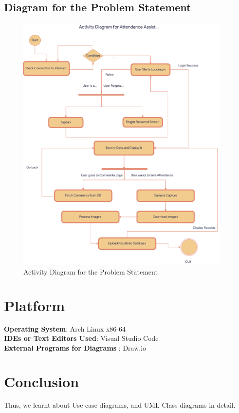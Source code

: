 \documentclass[11pt]{article}
\begin{document}
\clearpage
\subsection{Diagram for the Problem Statement}

\begin{figure}[H]
	\centering
	\includegraphics[width=0.95\textwidth]{activity dia.drawio.png}
	\caption{Activity Diagram for the Problem Statement}
\end{figure}
\section{Platform}
\textbf{Operating System}: Arch Linux x86-64 \\
\textbf{IDEs or Text Editors Used}: Visual Studio Code\\
\textbf{External Programs for Diagrams} : Draw.io\\


\section{Conclusion}
Thus, we learnt about Use case diagrams, and UML Class diagrams in detail.
\clearpage
\end{document}
